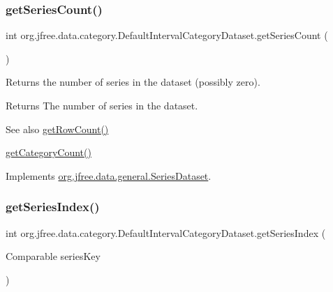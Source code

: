 \subsubsection{\texorpdfstring{get\+Series\+Count()}{getSeriesCount()}}
{\footnotesize\ttfamily int org.\+jfree.\+data.\+category.\+Default\+Interval\+Category\+Dataset.\+get\+Series\+Count (\begin{DoxyParamCaption}{ }\end{DoxyParamCaption})}

Returns the number of series in the dataset (possibly zero).

\begin{DoxyReturn}{Returns}
The number of series in the dataset.
\end{DoxyReturn}
\begin{DoxySeeAlso}{See also}
\mbox{\hyperlink{classorg_1_1jfree_1_1data_1_1category_1_1_default_interval_category_dataset_af827538c915c040aac83c23bc980b0f5}{get\+Row\+Count()}} 

\mbox{\hyperlink{classorg_1_1jfree_1_1data_1_1category_1_1_default_interval_category_dataset_af1e71ac84aa326b3b7ef89c398e5c0fb}{get\+Category\+Count()}} 
\end{DoxySeeAlso}


Implements \mbox{\hyperlink{interfaceorg_1_1jfree_1_1data_1_1general_1_1_series_dataset_a84fe822f5918f941d9de1ed1b73c9f58}{org.\+jfree.\+data.\+general.\+Series\+Dataset}}.

\mbox{\label{classorg_1_1jfree_1_1data_1_1category_1_1_default_interval_category_dataset_a11d3a851909daca3a6a279611a7151ba}} 
\subsubsection{\texorpdfstring{get\+Series\+Index()}{getSeriesIndex()}}
{\footnotesize\ttfamily int org.\+jfree.\+data.\+category.\+Default\+Interval\+Category\+Dataset.\+get\+Series\+Index (\begin{DoxyParamCaption}\item[{Comparable}]{series\+Key }\end{DoxyParamCaption})}

